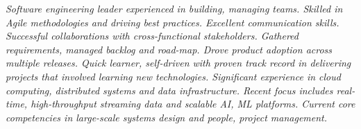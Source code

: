 {\selectfont
	\begin{small}
		\begin{justify}\textit{Software engineering leader experienced in building, managing teams. Skilled in Agile methodologies and driving best practices. Excellent communication skills. Successful collaborations with cross-functional stakeholders. Gathered requirements, managed backlog and road-map. Drove product adoption across multiple releases. Quick learner, self-driven with proven track record in delivering projects that involved learning new technologies. Significant experience in cloud computing, distributed systems and data infrastructure. Recent focus includes real-time, high-throughput streaming data and scalable AI, ML platforms. Current core competencies in large-scale systems design and people, project management.}\end{justify}
	\end{small}
}